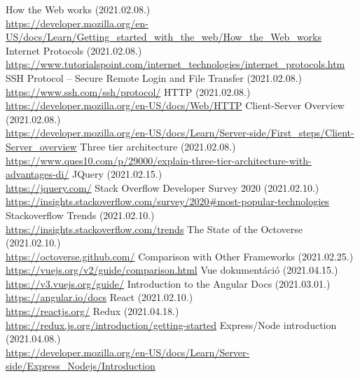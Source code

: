\documentclass[
]{thesis-ekf}
\theoremstyle{definition}
\theoremstyle{remark}
\begin{document}
\begin{thebibliography}{10}
How the Web works (2021.02.08.)
\\\url{https://developer.mozilla.org/en-US/docs/Learn/Getting\_started\_with\_the\_web/How\_the\_Web\_works}
Internet Protocols (2021.02.08.)
\\\url{https://www.tutorialspoint.com/internet\_technologies/internet\_protocols.htm}
SSH Protocol – Secure Remote Login and File Transfer (2021.02.08.)
\\\url{https://www.ssh.com/ssh/protocol/}
HTTP (2021.02.08.)
\\\url{https://developer.mozilla.org/en-US/docs/Web/HTTP}
Client-Server Overview (2021.02.08.)
\\\url{https://developer.mozilla.org/en-US/docs/Learn/Server-side/First\_steps/Client-Server\_overview}
Three tier architecture (2021.02.08.)
\\\url{https://www.ques10.com/p/29000/explain-three-tier-architecture-with-advantages-di/}
JQuery (2021.02.15.)
\\\url{https://jquery.com/}
Stack Overflow Developer Survey 2020 (2021.02.10.)
\\\url{https://insights.stackoverflow.com/survey/2020\#most-popular-technologies}
Stackoverflow Trends (2021.02.10.)
\\\url{https://insights.stackoverflow.com/trends}
The State of the Octoverse (2021.02.10.)
\\\url{https://octoverse.github.com/}
Comparison with Other Frameworks (2021.02.25.)
\\\url{https://vuejs.org/v2/guide/comparison.html}
Vue dokumentáció (2021.04.15.)
\\\url{https://v3.vuejs.org/guide/}
Introduction to the Angular Docs (2021.03.01.)
\\\url{https://angular.io/docs}
React (2021.02.10.)
\\\url{https://reactjs.org/}
Redux (2021.04.18.)
\\\url{https://redux.js.org/introduction/getting-started}
Express/Node introduction (2021.04.08.)
\\\url{https://developer.mozilla.org/en-US/docs/Learn/Server-side/Express\_Nodejs/Introduction}

\end{thebibliography}
\end{document}
